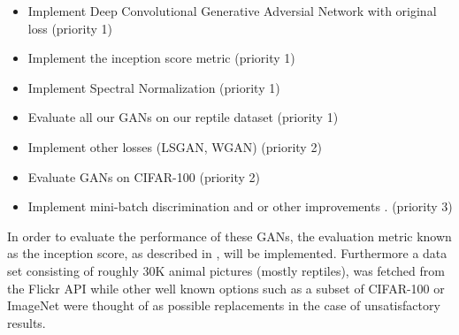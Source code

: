 \begin{itemize}
	\item Implement Deep Convolutional Generative Adversial Network with original loss \cite{DBLP:journals/corr/RadfordMC15} (priority 1)
	\item Implement the inception score metric \cite{salimans2016improved} (priority 1)
	\item Implement Spectral Normalization (priority 1)
	\item Evaluate all our GANs on our reptile dataset (priority 1)
	\item Implement other losses (LSGAN, WGAN) \cite{mao2017least} (priority 2)
	\item Evaluate GANs on CIFAR-100 (priority 2)
	\item Implement mini-batch discrimination and or other improvements \cite{salimans2016improved}. (priority 3)
\end{itemize}

In order to evaluate the performance of these GANs, the evaluation metric known as the inception score, as described in \cite{salimans2016improved}, will be implemented. Furthermore a data set consisting of roughly 30K animal pictures (mostly reptiles), was fetched from the Flickr API while other well known options such as a subset of CIFAR-100 or ImageNet were thought of as possible replacements in the case of unsatisfactory results.

